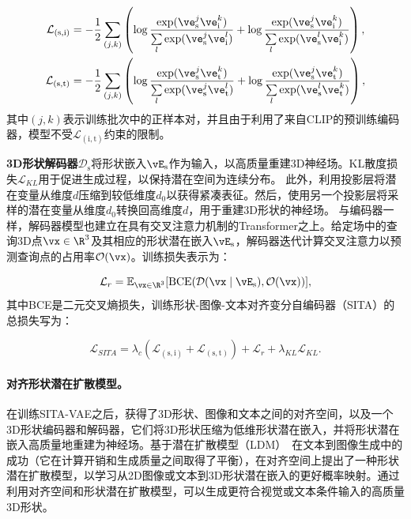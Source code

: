 \documentclass[../../book-main_zh.tex]{subfiles}
\begin{document}
\begin{equation}
\begin{aligned}
    \mathcal{L}_{(\mathrm{s},\mathrm{i})} &= - \frac{1}{2} \sum\limits_{(j,k)}
    \left(
        \log \frac{\exp (\ve_{\mathrm{s}}^j \ve_{\mathrm{i}}^k) }{
        \sum\limits_l \exp (\ve_{\mathrm{s}}^j \ve_{\mathrm{i}}^l) } +
        \log \frac{\exp (\ve_{\mathrm{s}}^j \ve_{\mathrm{i}}^k) }{
        \sum\limits_l \exp (\ve_{\mathrm{s}}^l \ve_{\mathrm{i}}^k) }
    \right), \\
    \mathcal{L}_{(\mathrm{s},\mathrm{t})}  &= - \frac{1}{2} \sum\limits_{(j,k)}
    \left(
        \log \frac{\exp (\ve_{\mathrm{s}}^j \ve_{\mathrm{t}}^k) }{
        \sum\limits_l \exp (\ve_{\mathrm{s}}^j \ve_{\mathrm{t}}^l) } +
        \log \frac{\exp (\ve_{\mathrm{s}}^j \ve_{\mathrm{t}}^k) }{
        \sum\limits_l \exp (\ve_{\mathrm{s}}^l \ve_{\mathrm{t}}^k) }
    \right), \\
\end{aligned}
\end{equation}
其中$(j,k)$表示训练批次中的正样本对，并且由于利用了来自CLIP的预训练编码器，模型不受$\mathcal{L}_{(\mathrm{i}, \mathrm{t})}$约束的限制。

\textbf{3D形状解码器}$\mathcal{D}_{\mathrm{s}}$将形状嵌入$\vE_{\mathrm{s}}$作为输入，以高质量重建3D神经场。KL散度损失$\mathcal{L}_{KL}$用于促进生成过程，以保持潜在空间为连续分布。
此外，利用投影层将潜在变量从维度$d$压缩到较低维度$d_0$以获得紧凑表征。然后，使用另一个投影层将采样的潜在变量从维度$d_0$转换回高维度$d$，用于重建3D形状的神经场。
与编码器一样，解码器模型也建立在具有交叉注意力机制的Transformer之上。给定场中的查询3D点$\vx \in \R^{3}$及其相应的形状潜在嵌入$\vE_{\mathrm{s}}$，解码器迭代计算交叉注意力以预测查询点的占用率$\mathcal{O} (\vx)$。训练损失表示为：

\begin{equation}
\mathcal{L}_r = \mathbb{E}_{\vx \in \R^3} [\text{BCE}(
\mathcal{D}(\vx \mid \vE_{\mathrm{s}} ), \mathcal{O}(\vx) )],
\end{equation}
其中BCE是二元交叉熵损失，训练形状-图像-文本对齐变分自编码器（SITA）的总损失写为：

\begin{equation}
\mathcal{L}_{SITA} = \lambda_c (\mathcal{L}_{(\mathrm{s},\mathrm{i})}
+ \mathcal{L}_{(\mathrm{s},\mathrm{t})}) + \mathcal{L}_r +
\lambda_{KL} \mathcal{L}_{KL}.
\label{eq:sita_vae}
\end{equation}

\paragraph{对齐形状潜在扩散模型。}
在训练SITA-VAE之后，获得了3D形状、图像和文本之间的对齐空间，以及一个3D形状编码器和解码器，它们将3D形状压缩为低维形状潜在嵌入，并将形状潜在嵌入高质量地重建为神经场。基于潜在扩散模型（LDM）~\cite{rombach2022high}在文本到图像生成中的成功（它在计算开销和生成质量之间取得了平衡），在对齐空间上提出了一种形状潜在扩散模型，以学习从2D图像或文本到3D形状潜在嵌入的更好概率映射。通过利用对齐空间和形状潜在扩散模型，可以生成更符合视觉或文本条件输入的高质量3D形状。
\end{document}
